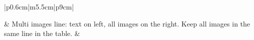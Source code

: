 \begin{longtable}{|p{0.6cm}|m{5.5cm}|p{9cm}|}
\\ \hline          


\centering \steplist
&
Multi images line: text on left, all images on the right. Keep all images in the same line in the table.
&
\begin{minipage}[b]{\linewidth}
    \centering
\end{minipage}\\ \hline



\end{longtable}
